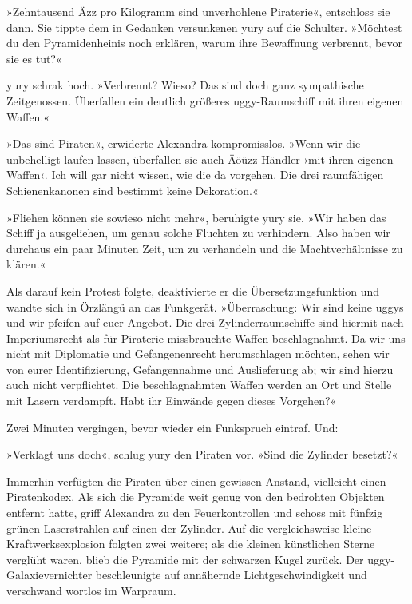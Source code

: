 
»Zehntausend Äzz pro Kilogramm sind unverhohlene Piraterie«, entschloss sie dann. Sie tippte dem in Gedanken versunkenen yury auf die Schulter. »Möchtest du den Pyramidenheinis noch erklären, warum ihre Bewaffnung verbrennt, bevor sie es tut?«

yury schrak hoch. »Verbrennt? Wieso? Das sind doch ganz sympathische Zeitgenossen. Überfallen ein deutlich größeres uggy-Raumschiff mit ihren eigenen Waffen.«

»Das sind Piraten«, erwiderte Alexandra kompromisslos. »Wenn wir die unbehelligt laufen lassen, überfallen sie auch Äöüzz-Händler ›mit ihren eigenen Waffen‹. Ich will gar nicht wissen, wie die da vorgehen. Die drei raumfähigen Schienenkanonen sind bestimmt keine Dekoration.«

»Fliehen können sie sowieso nicht mehr«, beruhigte yury sie. »Wir haben das Schiff ja ausgeliehen, um genau solche Fluchten zu verhindern. Also haben wir durchaus ein paar Minuten Zeit, um zu verhandeln und die Machtverhältnisse zu klären.«

Als darauf kein Protest folgte, deaktivierte er die Übersetzungsfunktion und wandte sich in Örzlängü an das Funkgerät. »Überraschung: Wir sind keine uggys und wir pfeifen auf euer Angebot. Die drei Zylinderraumschiffe sind hiermit nach Imperiumsrecht als für Piraterie missbrauchte Waffen beschlagnahmt. Da wir uns nicht mit Diplomatie und Gefangenenrecht herumschlagen möchten, sehen wir von eurer Identifizierung, Gefangennahme und Auslieferung ab; wir sind hierzu auch nicht verpflichtet. Die beschlagnahmten Waffen werden an Ort und Stelle mit Lasern verdampft. Habt ihr Einwände gegen dieses Vorgehen?«

Zwei Minuten vergingen, bevor wieder ein Funkspruch eintraf.  Und: 

»Verklagt uns doch«, schlug yury den Piraten vor. »Sind die Zylinder besetzt?«


Immerhin verfügten die Piraten über einen gewissen Anstand, vielleicht einen Piratenkodex. Als sich die Pyramide weit genug von den bedrohten Objekten entfernt hatte, griff Alexandra zu den Feuerkontrollen und schoss mit fünfzig grünen Laserstrahlen auf einen der Zylinder. Auf die vergleichsweise kleine Kraftwerksexplosion folgten zwei weitere; als die kleinen künstlichen Sterne verglüht waren, blieb die Pyramide mit der schwarzen Kugel zurück. Der uggy-Galaxievernichter beschleunigte auf annähernde Lichtgeschwindigkeit und verschwand wortlos im Warpraum.







